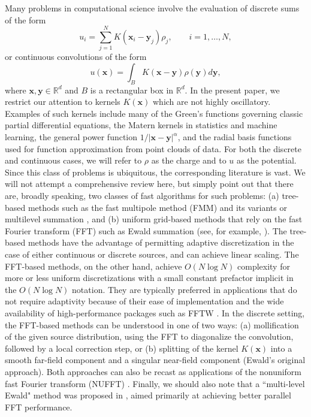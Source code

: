 \documentclass[final,letterpaper]{siamart171218}
\newcommand{\be}{\begin{equation}}
\newcommand{\ee}{\end{equation}}
\newcommand{\x}{\boldsymbol{x}}
\newcommand{\y}{\boldsymbol{y}}
\begin{document}
Many problems in computational science involve the  
evaluation of discrete sums of the form
\be\label{discretesum}
u_i=\sum_{j=1}^{N}K(\x_i-\y_j)\rho_j, \qquad i=1,\ldots,N,
\ee
or continuous convolutions of the form
\be\label{volumepotential}
u(\x)=\int_B K(\x-\y)\rho(\y)d\y,
\ee
where $\x, \y\in \mathbb{R}^d$ and $B$ is a rectangular box in $\mathbb{R}^d$.
In the present paper, we restrict our attention to kernels 
$K(\x)$ which are not highly oscillatory.
Examples of such kernels include many of the Green's functions governing 
classic partial differential equations, 
the Matern kernels in statistics
and machine learning, the general power function $1/|\x-\y|^\alpha$,
and the radial basis functions used for function
approximation from point clouds of data.
For both the discrete and continuous cases, we will refer to $\rho$ as the charge 
and to $u$ as the potential. 
Since this class of problems is ubiquitous, the 
corresponding literature is vast.
We will not attempt a comprehensive review here, but simply point out that
there are, broadly speaking, two classes of fast algorithms
for such problems: (a) tree-based methods such as the fast multipole 
method (FMM) and its variants
\cite{carrier1988sisc,fmm2,fmm3,fmm4,greengard1987jcp,fmm6,rokhlin1985jcp,
fmm7,zhang2011jcp}
or multilevel summation
\cite{brandt1990jcp,brandt1998,hardy2009pc,multilevel_summation_2015,
multilevel_summation_bspline,tensor_multilevel_ewald,skeel2002},
and (b) uniform grid-based methods that rely on the 
fast Fourier transform (FFT) such as Ewald summation
(see, for example, 
\cite{darden1993jcp,HE-1981,shamshirgar2021jcp,shaw_gaussian_ewald,TOUKMAJI199673}).
The tree-based methods have the advantage of permitting adaptive discretization
in the case of either continuous or discrete sources, and can achieve linear 
scaling.
The FFT-based methods, on the other hand, achieve $O(N \log N)$ complexity for 
more or less uniform
discretizations with a small constant prefactor implicit in the
$O(N \log N)$ notation. They are typically preferred in applications 
that do not require adaptivity because of their ease of implementation and the wide
availability of high-performance packages such as FFTW \cite{fftw97,fftw98}.
In the discrete setting, the FFT-based methods can be understood in one of two
ways: (a) mollification of the 
given source distribution, using the FFT to diagonalize 
the convolution, followed by a local correction step, or
(b) splitting of the kernel $K(\x)$ into a smooth far-field component and a 
singular near-field component  (Ewald's original approach). 
Both approaches can also be recast as applications of
the nonuniform fast Fourier transform (NUFFT) 
\cite{finufft,nufft2,nufft3,nufft6,potts2004}.
Finally, we should also note that a ``multi-level Ewald" method was proposed in 
\cite{multilevel_ewald}, aimed primarily at achieving better 
parallel FFT performance.
\end{document}

